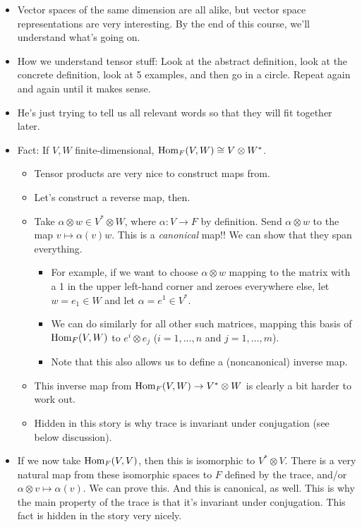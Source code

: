\documentclass[../notes.tex]{subfiles}
\begin{document}
\begin{itemize}
\begin{itemize}
    \end{itemize}
    \item Vector spaces of the same dimension are all alike, but vector space representations are very interesting. By the end of this course, we'll understand what's going on.
    \item How we understand tensor stuff: Look at the abstract definition, look at the concrete definition, look at 5 examples, and then go in a circle. Repeat again and again until it makes sense.
    \item He's just trying to tell us all relevant words so that they will fit together later.
    \item Fact: If $V,W$ finite-dimensional, $\operatorname{Hom}_F(V,W)\cong V\otimes W^*$.
    \begin{itemize}
        \item Tensor products are very nice to construct maps from.
        \item Let's construct a reverse map, then.
        \item Take $\alpha\otimes w\in V^*\otimes W$, where $\alpha:V\to F$ by definition. Send $\alpha\otimes w$ to the map $v\mapsto\alpha(v)w$. This is a \emph{canonical} map!! We can show that they span everything.
        \begin{itemize}
            \item For example, if we want to choose $\alpha\otimes w$ mapping to the matrix with a 1 in the upper left-hand corner and zeroes everywhere else, let $w=e_1\in W$ and let $\alpha=e^1\in V^*$.
            \item We can do similarly for all other such matrices, mapping this basis of $\operatorname{Hom}_F(V,W)$ to $e^i\otimes e_j$ ($i=1,\dots,n$ and $j=1,\dots,m$).
            \item Note that this also allows us to define a (noncanonical) inverse map.
        \end{itemize}
        \item This inverse map from $\operatorname{Hom}_F(V,W)\to V^*\otimes W$ is clearly a bit harder to work out.
        \item Hidden in this story is why trace is invariant under conjugation (see below discussion).
    \end{itemize}
    \item If we now take $\operatorname{Hom}_F(V,V)$, then this is isomorphic to $V^*\otimes V$. There is a very natural map from these isomorphic spaces to $F$ defined by the trace, and/or $\alpha\otimes v\mapsto\alpha(v)$. We can prove this. And this is canonical, as well. This is why the main property of the trace is that it's invariant under conjugation. This fact is hidden in the story very nicely.

\end{itemize}
\end{document}
